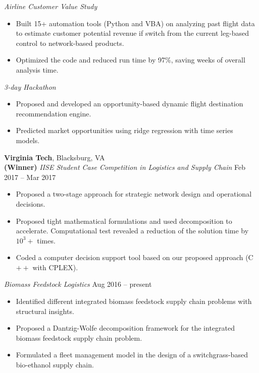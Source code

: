 \documentclass[11pt,letterpaper]{article}
\begin{document}
\smallskip
\textit{Airline Customer Value Study}
\begin{itemize}
	\item Built 15+ automation tools (Python and VBA) on analyzing past flight data to estimate customer potential revenue if switch from the current leg-based control to network-based products. 
	\item Optimized the code and reduced run time by 97\%, saving weeks of overall analysis time. 
\end{itemize}

\smallskip
\textit{3-day Hackathon}
\begin{itemize}
	\item Proposed and developed an opportunity-based dynamic flight destination recommendation engine. 
	\item Predicted market opportunities using ridge regression with time series models.
\end{itemize}


\medskip
\textbf{Virginia Tech}, Blacksburg, VA  \\
\textbf{(Winner)}\textit{ IISE Student Case Competition in Logistics and Supply Chain}  \hfill{{Feb 2017 -- Mar 2017}}
\begin{itemize}
	\item Proposed a two-stage approach for strategic network design and operational decisions. 
	\item Proposed tight mathematical formulations and used decomposition to accelerate. Computational test revealed a reduction of the solution time by $10^3 +$ times.
	\item Coded a computer decision support tool based on our proposed approach (C$++$ with CPLEX). 
\end{itemize}

\smallskip
\textit{Biomass Feedstock Logistics}    \hfill{{Aug 2016 -- present}} 
\begin{itemize}
	\item Identified different integrated biomass feedstock supply chain problems with structural insights.
	\item Proposed a Dantzig-Wolfe decomposition framework for the integrated biomass feedstock supply chain problem.
	\item Formulated a fleet management model in the design of a switchgrass-based bio-ethanol supply chain.
\end{itemize}
\end{document}
